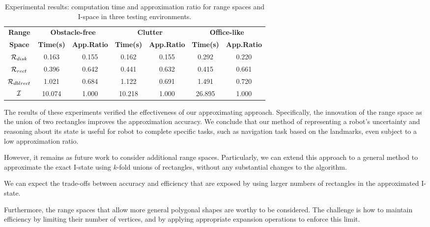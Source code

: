 \begin{table}
  \small\centering
  \caption{Experimental results: computation time and approximation
      ratio for range spaces and I-space in three testing environments.}
    \begin{tabular}{ccccccc} 
    \toprule 
    \textbf{Range}  & \multicolumn{2}{c}{\textbf{Obstacle-free}} & \multicolumn{2}{c}{\textbf{Clutter}} & \multicolumn{2}{c}{\textbf{Office-like}}\\
    \textbf{Space} & \textbf{Time(s)} & \textbf{App.Ratio} & \textbf{Time(s)} & \textbf{App.Ratio} & \textbf{Time(s)} & \textbf{App.Ratio} \\
    \midrule
    $\mathcal{R}_{disk}$ & 0.163 & 0.155 & 0.162 & 0.155  & 0.292 & 0.220\\ 
    \midrule
    $\mathcal{R}_{rect}$ & 0.396 & 0.642  & 0.441 & 0.632 & 0.415 & 0.661\\
    \midrule
    $\mathcal{R}_{dblrect}$ & 1.021 & 0.684 & 1.122 & 0.691 & 1.491 & 0.720\\
    \midrule
    $\mathcal{I}$ & 10.074 & 1.000 & 10.218 & 1.000 & 26.895 & 1.000\\
    \bottomrule     
    \end{tabular}
    \label{tab:exp-data}
\end{table}


The results of these experiments verified the effectiveness of our approximating approach.
%
Specifically, the innovation of the range space as the union of
two rectangles improves the approximation accuracy. 
%
We conclude that our method of representing a robot's uncertainty and reasoning about its state is useful 
for robot to complete specific tasks, such as navigation task based on the landmarks, even subject to a low approximation ratio.

However, it remains as future work to consider additional range spaces.  
%
Particularly, we can extend this approach to a general method to approximate the exact I-state using $k$-fold unions of rectangles, 
without any substantial changes to the algorithm.  

We can expect the trade-offs between accuracy and efficiency that are exposed by using
larger numbers of rectangles in the approximated I-state.  

Furthermore, the range spaces that allow more general polygonal shapes are worthy to be considered. 
The challenge is how to maintain efficiency by limiting their number of vertices, 
and by applying appropriate expansion operations to enforce this limit.



